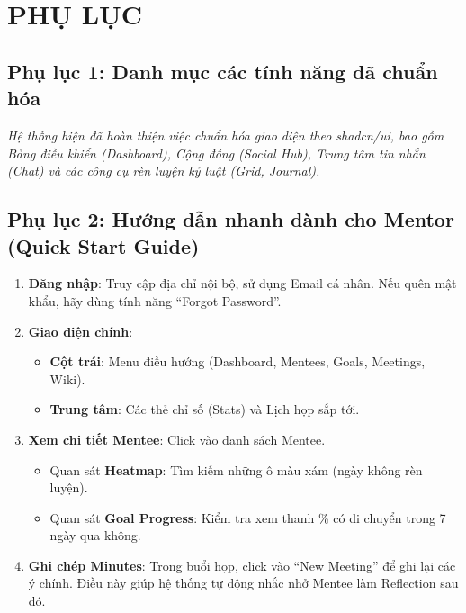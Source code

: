 \chapter*{PHỤ LỤC}

\section*{Phụ lục 1: Danh mục các tính năng đã chuẩn hóa}

\textit{Hệ thống hiện đã hoàn thiện việc chuẩn hóa giao diện theo shadcn/ui, bao gồm Bảng điều khiển (Dashboard), Cộng đồng (Social Hub), Trung tâm tin nhắn (Chat) và các công cụ rèn luyện kỷ luật (Grid, Journal).}

\section*{Phụ lục 2: Hướng dẫn nhanh dành cho Mentor (Quick Start Guide)}

\begin{enumerate}
  \item \textbf{Đăng nhập}: Truy cập địa chỉ nội bộ, sử dụng Email cá nhân. Nếu quên mật khẩu, hãy dùng tính năng ``Forgot Password''.
  \item \textbf{Giao diện chính}:
    \begin{itemize}
        \item \textbf{Cột trái}: Menu điều hướng (Dashboard, Mentees, Goals, Meetings, Wiki).
        \item \textbf{Trung tâm}: Các thẻ chỉ số (Stats) và Lịch họp sắp tới.
    \end{itemize}
  \item \textbf{Xem chi tiết Mentee}: Click vào danh sách Mentee. 
    \begin{itemize}
        \item Quan sát \textbf{Heatmap}: Tìm kiếm những ô màu xám (ngày không rèn luyện).
        \item Quan sát \textbf{Goal Progress}: Kiểm tra xem thanh \% có di chuyển trong 7 ngày qua không.
    \end{itemize}
  \item \textbf{Ghi chép Minutes}: Trong buổi họp, click vào ``New Meeting'' để ghi lại các ý chính. Điều này giúp hệ thống tự động nhắc nhở Mentee làm Reflection sau đó.
\end{enumerate}

